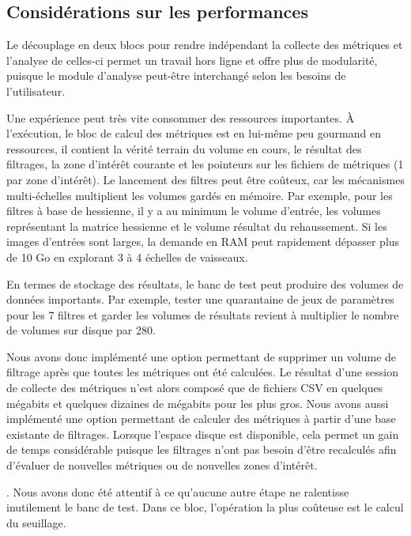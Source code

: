 \subsection{Considérations sur les performances}

Le découplage en deux blocs pour rendre indépendant la collecte des métriques et l'analyse de celles-ci permet un travail hors ligne et offre plus de modularité, puisque le module d'analyse peut-être interchangé selon les besoins de l'utilisateur. 

Une expérience peut très vite consommer des ressources importantes. À l'exécution, le bloc de calcul des métriques est en lui-même peu gourmand en ressources, il contient la vérité terrain du volume en cours, le résultat des filtrages, la zone d'intérêt courante et les pointeurs sur les fichiers de métriques (1 par zone d'intérêt). Le lancement des filtres peut être coûteux, car les mécanismes multi-échelles multiplient les volumes gardés en mémoire. Par exemple, pour les filtres à base de hessienne, il y a au minimum le volume d'entrée, les volumes représentant la matrice hessienne et le volume résultat du rehaussement. Si les images d'entrées sont larges, la demande en RAM peut rapidement dépasser plus de 10 Go en explorant 3 à 4 échelles de vaisseaux. 

En termes de stockage des résultats, le banc de test peut produire des volumes de données importants. Par exemple, tester une quarantaine de jeux de paramètres pour les 7 filtres et garder les volumes de résultats revient à multiplier le nombre de volumes sur disque par 280. 

Nous avons donc implémenté une option permettant de supprimer un volume de filtrage après que toutes les métriques ont été calculées. Le résultat d'une session de collecte des métriques n'est alors composé que de fichiers CSV en quelques mégabits et quelques dizaines de mégabits pour les plus gros. Nous avons aussi implémenté une option permettant de calculer des métriques à partir d'une base existante de filtrages. Lorsque l'espace disque est disponible, cela permet un gain de temps considérable puisque les filtrages n'ont pas besoin d'être recalculés afin d'évaluer de nouvelles métriques ou de nouvelles zones d'intérêt.

. Nous avons donc été attentif à ce qu'aucune autre étape ne ralentisse inutilement le banc de test. Dans ce bloc, l'opération la plus coûteuse est le calcul du seuillage.

